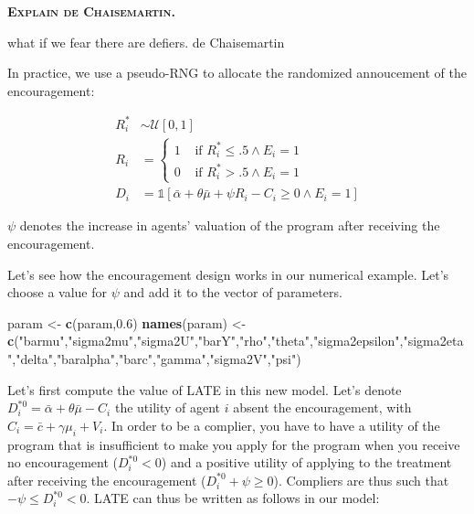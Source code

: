 \documentclass[]{book}
\newenvironment{Shaded}{\begin{snugshade}}{\end{snugshade}}
\newcommand{\KeywordTok}[1]{\textcolor[rgb]{0.13,0.29,0.53}{\textbf{#1}}}
\newcommand{\FloatTok}[1]{\textcolor[rgb]{0.00,0.00,0.81}{#1}}
\newcommand{\StringTok}[1]{\textcolor[rgb]{0.31,0.60,0.02}{#1}}
\newcommand{\NormalTok}[1]{#1}
\newcommand{\uns}[1]{\mathds{1}[ #1 ]}
\theoremstyle{definition}
\theoremstyle{definition}
\theoremstyle{definition}
\theoremstyle{remark}
\let\BeginKnitrBlock\begin \let\EndKnitrBlock\end
\begin{document}
\textbf{\textsc{Explain de Chaisemartin.}}

\BeginKnitrBlock{remark}
\iffalse{} {Remark. } \fi{}what if we fear there are defiers. de
Chaisemartin
\EndKnitrBlock{remark}

\BeginKnitrBlock{remark}
\iffalse{} {Remark. } \fi{}In practice, we use a pseudo-RNG to allocate
the randomized annoucement of the encouragement:
\EndKnitrBlock{remark}

\begin{align*}
  R_i^* & \sim \mathcal{U}[0,1]\\
  R_i & = 
  \begin{cases}
    1 & \text{ if } R_i^*\leq .5 \land E_i=1\\
    0 & \text{ if } R_i^*> .5 \land E_i=1
  \end{cases} \\
  D_i & = \uns{\bar{\alpha}+\theta\bar{\mu}+\psi R_i-C_i\geq0 \land E_i=1}
\end{align*}

\(\psi\) denotes the increase in agents' valuation of the program after
receiving the encouragement.

\BeginKnitrBlock{example}
\protect\hypertarget{exm:unnamed-chunk-117}{}{\label{exm:unnamed-chunk-117}
}Let's see how the encouragement design works in our numerical example.
Let's choose a value for \(\psi\) and add it to the vector of
parameters.
\EndKnitrBlock{example}

\begin{Shaded}
\begin{Highlighting}[]
\NormalTok{param <-}\StringTok{ }\KeywordTok{c}\NormalTok{(param,}\FloatTok{0.6}\NormalTok{)}
\KeywordTok{names}\NormalTok{(param) <-}\StringTok{ }\KeywordTok{c}\NormalTok{(}\StringTok{"barmu"}\NormalTok{,}\StringTok{"sigma2mu"}\NormalTok{,}\StringTok{"sigma2U"}\NormalTok{,}\StringTok{"barY"}\NormalTok{,}\StringTok{"rho"}\NormalTok{,}\StringTok{"theta"}\NormalTok{,}\StringTok{"sigma2epsilon"}\NormalTok{,}\StringTok{"sigma2eta"}\NormalTok{,}\StringTok{"delta"}\NormalTok{,}\StringTok{"baralpha"}\NormalTok{,}\StringTok{"barc"}\NormalTok{,}\StringTok{"gamma"}\NormalTok{,}\StringTok{"sigma2V"}\NormalTok{,}\StringTok{"psi"}\NormalTok{)}
\end{Highlighting}
\end{Shaded}

Let's first compute the value of LATE in this new model. Let's denote
\(D_i^{*0}=\bar{\alpha}+\theta\bar{\mu}-C_i\) the utility of agent \(i\)
absent the encouragement, with \(C_i=\bar{c} + \gamma \mu_i + V_i\). In
order to be a complier, you have to have a utility of the program that
is insufficient to make you apply for the program when you receive no
encouragement (\(D_i^{*0}<0\)) and a positive utility of applying to the
treatment after receiving the encouragement (\(D_i^{*0}+\psi\geq 0\)).
Compliers are thus such that \(-\psi\leq D_i^{*0}<0\). LATE can thus be
written as follows in our model:
\end{document}
